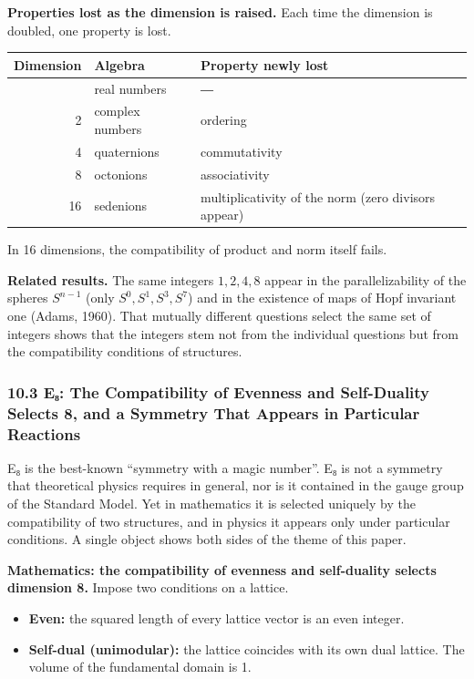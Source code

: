 \documentclass[
  a4paper,
]{article}
\newcounter{none} %
\providecommand{\tightlist}{%
  \setlength{\itemsep}{0pt}\setlength{\parskip}{0pt}}
\begin{document}
\textbf{Properties lost as the dimension is raised.} Each time the
dimension is doubled, one property is lost.

{\def\LTcaptype{none} %
\begin{longtable}[]{@{}rll@{}}
\toprule\noalign{}
Dimension & Algebra & Property newly lost \\
\midrule\noalign{}
\endhead
\bottomrule\noalign{}
\endlastfoot
1 & real numbers & ― \\
2 & complex numbers & ordering \\
4 & quaternions & commutativity \\
8 & octonions & associativity \\
16 & sedenions & multiplicativity of the norm (zero divisors appear) \\
\end{longtable}
}

In 16 dimensions, the compatibility of product and norm itself fails.

\textbf{Related results.} The same integers \(1,2,4,8\) appear in the
parallelizability of the spheres \(S^{n-1}\) (only \(S^0,S^1,S^3,S^7\))
and in the existence of maps of Hopf invariant one (Adams, 1960). That
mutually different questions select the same set of integers shows that
the integers stem not from the individual questions but from the
compatibility conditions of structures.

\subsubsection{10.3 E₈: The Compatibility of Evenness and Self-Duality
Selects 8, and a Symmetry That Appears in Particular
Reactions}\label{eux2088-the-compatibility-of-evenness-and-self-duality-selects-8-and-a-symmetry-that-appears-in-particular-reactions}

E₈ is the best-known ``symmetry with a magic number''. E₈ is not a
symmetry that theoretical physics requires in general, nor is it
contained in the gauge group of the Standard Model. Yet in mathematics
it is selected uniquely by the compatibility of two structures, and in
physics it appears only under particular conditions. A single object
shows both sides of the theme of this paper.

\textbf{Mathematics: the compatibility of evenness and self-duality
selects dimension 8.} Impose two conditions on a lattice.

\begin{itemize}
\tightlist
\item
  \textbf{Even:} the squared length of every lattice vector is an even
  integer.
\item
  \textbf{Self-dual (unimodular):} the lattice coincides with its own
  dual lattice. The volume of the fundamental domain is 1.
\end{itemize}
\end{document}
